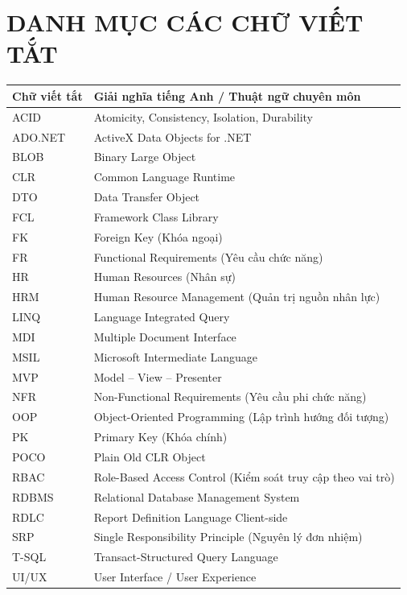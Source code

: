 \documentclass[12pt,a4paper]{report}
\begin{document}
\chapter*{DANH MỤC CÁC CHỮ VIẾT TẮT}
\begin{longtable}{|l|p{11.5cm}|}
\hline
\textbf{Chữ viết tắt} & \textbf{Giải nghĩa tiếng Anh / Thuật ngữ chuyên môn} \\ \hline
\endhead
ACID & Atomicity, Consistency, Isolation, Durability \\ \hline
ADO.NET & ActiveX Data Objects for .NET \\ \hline
BLOB & Binary Large Object \\ \hline
CLR & Common Language Runtime \\ \hline
DTO & Data Transfer Object \\ \hline
FCL & Framework Class Library \\ \hline
FK & Foreign Key (Khóa ngoại) \\ \hline
FR & Functional Requirements (Yêu cầu chức năng) \\ \hline
HR & Human Resources (Nhân sự) \\ \hline
HRM & Human Resource Management (Quản trị nguồn nhân lực) \\ \hline
LINQ & Language Integrated Query \\ \hline
MDI & Multiple Document Interface \\ \hline
MSIL & Microsoft Intermediate Language \\ \hline
MVP & Model -- View -- Presenter \\ \hline
NFR & Non-Functional Requirements (Yêu cầu phi chức năng) \\ \hline
OOP & Object-Oriented Programming (Lập trình hướng đối tượng) \\ \hline
PK & Primary Key (Khóa chính) \\ \hline
POCO & Plain Old CLR Object \\ \hline
RBAC & Role-Based Access Control (Kiểm soát truy cập theo vai trò) \\ \hline
RDBMS & Relational Database Management System \\ \hline
RDLC & Report Definition Language Client-side \\ \hline
SRP & Single Responsibility Principle (Nguyên lý đơn nhiệm) \\ \hline
T-SQL & Transact-Structured Query Language \\ \hline
UI/UX & User Interface / User Experience \\ \hline
\end{longtable}
\end{document}
